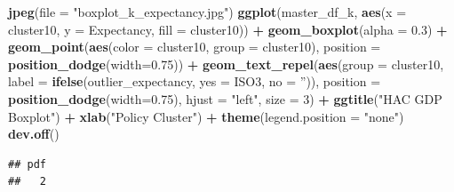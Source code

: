 \documentclass[]{article}
\newenvironment{Shaded}{\begin{snugshade}}{\end{snugshade}}
\newcommand{\DataTypeTok}[1]{\textcolor[rgb]{0.13,0.29,0.53}{#1}}
\newcommand{\DecValTok}[1]{\textcolor[rgb]{0.00,0.00,0.81}{#1}}
\newcommand{\FloatTok}[1]{\textcolor[rgb]{0.00,0.00,0.81}{#1}}
\newcommand{\KeywordTok}[1]{\textcolor[rgb]{0.13,0.29,0.53}{\textbf{#1}}}
\newcommand{\NormalTok}[1]{#1}
\newcommand{\OperatorTok}[1]{\textcolor[rgb]{0.81,0.36,0.00}{\textbf{#1}}}
\newcommand{\StringTok}[1]{\textcolor[rgb]{0.31,0.60,0.02}{#1}}
\begin{document}
\begin{Shaded}
\begin{Highlighting}[]
\KeywordTok{jpeg}\NormalTok{(}\DataTypeTok{file =} \StringTok{"boxplot_k_expectancy.jpg"}\NormalTok{)}
\KeywordTok{ggplot}\NormalTok{(master_df_k, }
       \KeywordTok{aes}\NormalTok{(}\DataTypeTok{x =}\NormalTok{ cluster10, }\DataTypeTok{y =}\NormalTok{ Expectancy, }\DataTypeTok{fill =}\NormalTok{ cluster10)) }\OperatorTok{+}
\StringTok{  }\KeywordTok{geom_boxplot}\NormalTok{(}\DataTypeTok{alpha =} \FloatTok{0.3}\NormalTok{) }\OperatorTok{+}
\StringTok{  }\KeywordTok{geom_point}\NormalTok{(}\KeywordTok{aes}\NormalTok{(}\DataTypeTok{color =}\NormalTok{ cluster10, }\DataTypeTok{group =}\NormalTok{ cluster10), }\DataTypeTok{position =} \KeywordTok{position_dodge}\NormalTok{(}\DataTypeTok{width=}\FloatTok{0.75}\NormalTok{)) }\OperatorTok{+}
\StringTok{  }\KeywordTok{geom_text_repel}\NormalTok{(}\KeywordTok{aes}\NormalTok{(}\DataTypeTok{group =}\NormalTok{ cluster10, }
                \DataTypeTok{label =} \KeywordTok{ifelse}\NormalTok{(outlier_expectancy, }
                  \DataTypeTok{yes =}\NormalTok{ ISO3,}
                  \DataTypeTok{no =} \StringTok{''}\NormalTok{)), }
            \DataTypeTok{position =} \KeywordTok{position_dodge}\NormalTok{(}\DataTypeTok{width=}\FloatTok{0.75}\NormalTok{),}
            \DataTypeTok{hjust =} \StringTok{"left"}\NormalTok{, }\DataTypeTok{size =} \DecValTok{3}\NormalTok{) }\OperatorTok{+}\StringTok{ }\KeywordTok{ggtitle}\NormalTok{(}\StringTok{"HAC GDP Boxplot"}\NormalTok{) }\OperatorTok{+}\StringTok{ }
\StringTok{  }\KeywordTok{xlab}\NormalTok{(}\StringTok{"Policy Cluster"}\NormalTok{) }\OperatorTok{+}\StringTok{ }\KeywordTok{theme}\NormalTok{(}\DataTypeTok{legend.position =} \StringTok{"none"}\NormalTok{)}
\KeywordTok{dev.off}\NormalTok{()}
\end{Highlighting}
\end{Shaded}

\begin{verbatim}
## pdf 
##   2
\end{verbatim}
\end{document}
